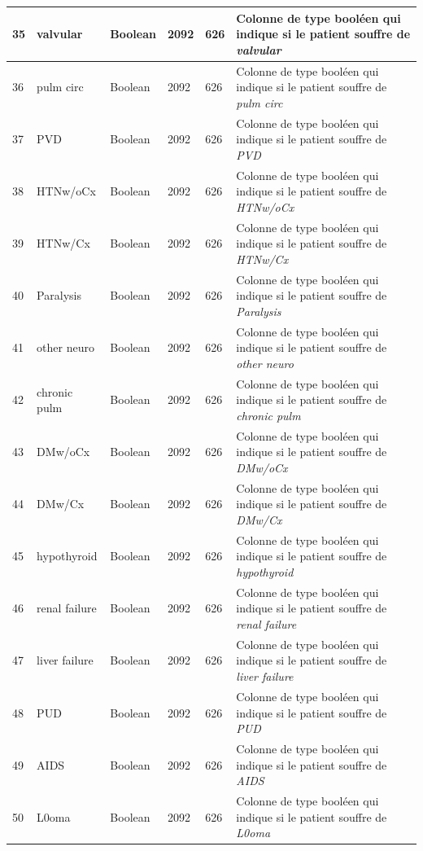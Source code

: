 \documentclass[12pt, french]{report}
\begin{document}
\begin{longtable}{| p{} | p{} | p{} | p{}  | p{} | p{} |  }
35 &	valvular & Boolean & 2092 & 626& Colonne de type booléen qui indique si le patient souffre  de \textit{valvular} \\ \hline 
36 &	pulm circ & Boolean & 2092 & 626& Colonne de type booléen qui indique si le patient souffre  de \textit{pulm circ} \\ \hline 
37 &	PVD & Boolean & 2092 & 626& Colonne de type booléen qui indique si le patient souffre  de \textit{PVD} \\ \hline 
38 &	HTNw/oCx & Boolean & 2092 & 626& Colonne de type booléen qui indique si le patient souffre  de \textit{HTNw/oCx} \\ \hline 
39 &	HTNw/Cx & Boolean & 2092 & 626& Colonne de type booléen qui indique si le patient souffre  de \textit{HTNw/Cx} \\ \hline 
40 &	Paralysis & Boolean & 2092 & 626& Colonne de type booléen qui indique si le patient souffre  de \textit{Paralysis} \\ \hline 
41 &	other neuro & Boolean & 2092 & 626& Colonne de type booléen qui indique si le patient souffre  de \textit{other neuro} \\ \hline 
42 &	chronic pulm & Boolean & 2092 & 626& Colonne de type booléen qui indique si le patient souffre  de \textit{chronic pulm} \\ \hline 
43 &	DMw/oCx & Boolean & 2092 & 626& Colonne de type booléen qui indique si le patient souffre  de \textit{DMw/oCx} \\ \hline 
44 &	DMw/Cx & Boolean & 2092 & 626& Colonne de type booléen qui indique si le patient souffre  de \textit{DMw/Cx} \\ \hline 
45 &	hypothyroid & Boolean & 2092 & 626& Colonne de type booléen qui indique si le patient souffre  de \textit{hypothyroid} \\ \hline 
46 &	renal failure & Boolean & 2092 & 626& Colonne de type booléen qui indique si le patient souffre  de \textit{renal failure} \\ \hline 
47 &	liver failure & Boolean & 2092 & 626& Colonne de type booléen qui indique si le patient souffre  de \textit{liver failure} \\ \hline 
48 &	PUD & Boolean & 2092 & 626& Colonne de type booléen qui indique si le patient souffre  de \textit{PUD} \\ \hline 
49 &	AIDS & Boolean & 2092 & 626& Colonne de type booléen qui indique si le patient souffre  de \textit{AIDS} \\ \hline 
50 &	L0oma & Boolean & 2092 & 626& Colonne de type booléen qui indique si le patient souffre  de \textit{L0oma} \\ \hline 

\end{longtable}
\end{document}
